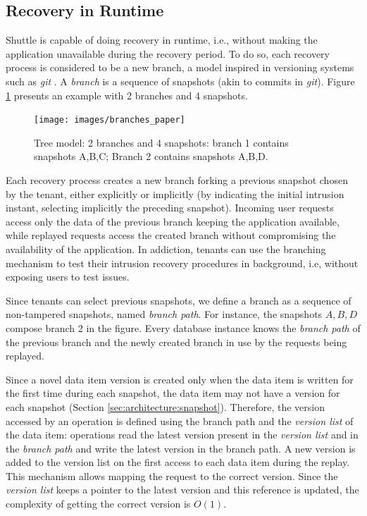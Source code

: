 \subsection{Recovery in Runtime}
\label{sec:recovery:runtime_recovery}
Shuttle is capable of doing recovery in runtime, i.e., without making the application unavailable during the recovery period. To do so, each recovery process is considered to be a new branch, a model inspired in versioning systems such as \emph{git} \cite{git}. A \emph{branch} is a sequence of snapshots (akin to commits in \emph{git}). Figure \ref{fig:branches} presents an example with 2 branches and 4 snapshots.

\begin{figure}
  \centering
  \texttt{[image: images/branches\_paper]}
  \caption{\footnotesize{Tree model:} 2 branches and 4 snapshots: branch 1 contains snapshots A,B,C; Branch 2 contains snapshots A,B,D.} %
  \label{fig:branches}
\end{figure}

Each recovery process creates a new branch forking a previous snapshot chosen by the tenant, either explicitly or implicitly (by indicating the initial intrusion instant, selecting implicitly the preceding snapshot). Incoming user requests access only the data of the previous branch keeping the application available, while replayed requests access the created branch without compromising the availability of the application. In addiction, tenants can use the branching mechanism to test their intrusion recovery procedures in background, i.e, without exposing users to test issues.

Since tenants can select previous snapshots, we define a branch as a sequence of non-tampered snapshots, named \emph{branch path}. For instance, the snapshots $A,B,D$ compose  branch 2 in the figure. Every database instance knows the \emph{branch path} of the previous branch and the newly created branch in use by the requests being replayed.

Since a novel data item version is created only when the data item is written for the first time during each snapshot, the data item may not have a version for each snapshot (Section \ref{sec:architecture:snapshot}). Therefore, the version accessed by an operation is defined using the branch path and the \emph{version list} of the data item: operations read the latest version present in the \emph{version list} and in the \emph{branch path} and write the latest version in the branch path. A new version is added to the version list on the first access to each data item during the replay. This mechanism allows mapping the request to the correct version. Since the \emph{version list} keeps a pointer to the latest version and this reference is updated, the complexity of getting the correct version is $O(1)$. 

